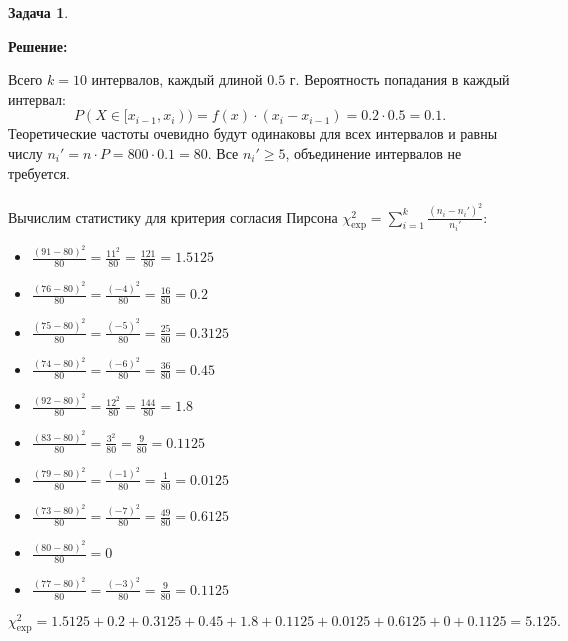 \documentclass[a4paper,11pt]{article}
\newenvironment{shdd}{\begin{mdframed}[backgroundcolor=shadecolor]}{\end{mdframed}}
\theoremstyle{definition}
\newtheorem{problem}{Задача}\setlength{\parindent}{0pt}
\newenvironment{solution}
{\begin{shdd}
     \textbf{Решение:}\par\setlength{\parindent}{0pt}}
     {
\end{shdd}}
\begin{document}
\begin{problem}
\begin{solution}
            Всего \(k = 10\) интервалов, каждый длиной \(0.5\) г. Вероятность попадания в каждый интервал:
            \[
                P(X \in [x_{i-1}, x_i)) = f(x) \cdot (x_i - x_{i-1}) = 0.2 \cdot 0.5 = 0.1.
            \]
            Теоретические частоты очевидно будут одинаковы для всех интервалов
            и равны числу \(n_i' = n \cdot P = 800 \cdot 0.1 = 80\). Все \(n_i' \geq 5\), объединение интервалов не требуется.\\
            \\
            Вычислим статистику для критерия согласия Пирсона \(\chi^2_{\text{exp}} = \sum_{i=1}^k \frac{(n_i - n_i')^2}{n_i'}\):
            \begin{itemize}
                \item \(\frac{(91 - 80)^2}{80} = \frac{11^2}{80} = \frac{121}{80} = 1.5125\)\\
                \item \(\frac{(76 - 80)^2}{80} = \frac{(-4)^2}{80} = \frac{16}{80} = 0.2\)\\
                \item \(\frac{(75 - 80)^2}{80} = \frac{(-5)^2}{80} = \frac{25}{80} = 0.3125\)\\
                \item \(\frac{(74 - 80)^2}{80} = \frac{(-6)^2}{80} = \frac{36}{80} = 0.45\)\\
                \item \(\frac{(92 - 80)^2}{80} = \frac{12^2}{80} = \frac{144}{80} = 1.8\)\\
                \item \(\frac{(83 - 80)^2}{80} = \frac{3^2}{80} = \frac{9}{80} = 0.1125\)\\
                \item \(\frac{(79 - 80)^2}{80} = \frac{(-1)^2}{80} = \frac{1}{80} = 0.0125\)\\
                \item \(\frac{(73 - 80)^2}{80} = \frac{(-7)^2}{80} = \frac{49}{80} = 0.6125\)\\
                \item \(\frac{(80 - 80)^2}{80} = 0\)\\
                \item \(\frac{(77 - 80)^2}{80} = \frac{(-3)^2}{80} = \frac{9}{80} = 0.1125\)\\
            \end{itemize}
            \[
                \chi^2_{\text{exp}} = 1.5125 + 0.2 + 0.3125 + 0.45 + 1.8 + 0.1125 + 0.0125 + 0.6125 + 0 + 0.1125 = 5.125.
            \]


\end{solution}
\end{problem}
\end{document}
